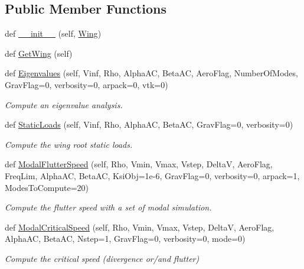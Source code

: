 \subsection*{Public Member Functions}
\begin{DoxyCompactItemize}
\item 
def \hyperlink{classgebtaero_1_1_simulation_1_1_simulation_a865b25fd48ff7aded232e634e28679c3}{\+\_\+\+\_\+init\+\_\+\+\_\+} (self, \hyperlink{classgebtaero_1_1_wing_1_1_wing}{Wing})
\item 
def \hyperlink{classgebtaero_1_1_simulation_1_1_simulation_a2d7432b48522221861693e98b03568c4}{Get\+Wing} (self)
\item 
def \hyperlink{classgebtaero_1_1_simulation_1_1_simulation_a03a37673e2e1c67de5eaeb261512d122}{Eigenvalues} (self, Vinf, Rho, Alpha\+AC, Beta\+AC, Aero\+Flag, Number\+Of\+Modes, Grav\+Flag=0, verbosity=0, arpack=0, vtk=0)
\begin{DoxyCompactList}\small\item\em Compute an eigenvalue analysis. \end{DoxyCompactList}\item 
def \hyperlink{classgebtaero_1_1_simulation_1_1_simulation_a36da2334a6e743a9ab29bdfe1334ed04}{Static\+Loads} (self, Vinf, Rho, Alpha\+AC, Beta\+AC, Grav\+Flag=0, verbosity=0)
\begin{DoxyCompactList}\small\item\em Compute the wing root static loads. \end{DoxyCompactList}\item 
def \hyperlink{classgebtaero_1_1_simulation_1_1_simulation_ab62864a7bf462387f4cbe24b061b803a}{Modal\+Flutter\+Speed} (self, Rho, Vmin, Vmax, Vstep, DeltaV, Aero\+Flag, Freq\+Lim, Alpha\+AC, Beta\+AC, Ksi\+Obj=1e-\/6, Grav\+Flag=0, verbosity=0, arpack=1, Modes\+To\+Compute=20)
\begin{DoxyCompactList}\small\item\em Compute the flutter speed with a set of modal simulation. \end{DoxyCompactList}\item 
def \hyperlink{classgebtaero_1_1_simulation_1_1_simulation_a9e1695e4fd6c14ac4c9ddcf488ba6b77}{Modal\+Critical\+Speed} (self, Rho, Vmin, Vmax, Vstep, DeltaV, Aero\+Flag, Alpha\+AC, Beta\+AC, Nstep=1, Grav\+Flag=0, verbosity=0, mode=0)
\begin{DoxyCompactList}\small\item\em Compute the critical speed (divergence or/and flutter) \end{DoxyCompactList}\item 

\end{DoxyCompactItemize}
